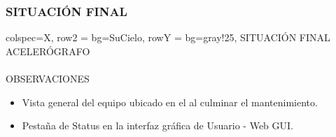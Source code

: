 \subsubsection{SITUACIÓN FINAL}
\begin{tblr}{
    colspec={X},
    row{2} = {bg=SuCielo},
    row{Y} = {bg=gray!25},
}
    SITUACIÓN FINAL \\
    ACELERÓGRAFO \MakeUppercase{} \\
     \\
    OBSERVACIONES \\
    \begin{itemize}
        \item Vista general del equipo ubicado en el  al culminar el mantenimiento.
        \item Pestaña de Status en la interfaz gráfica de Usuario - Web GUI.
    \end{itemize}
\end{tblr}
